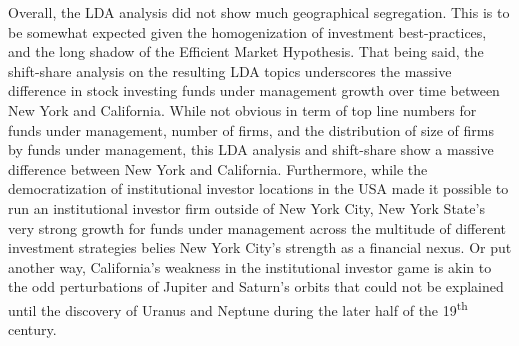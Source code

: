 Overall, the LDA analysis did not show much geographical segregation.  This is to be somewhat expected given the homogenization of investment best-practices, and the long shadow of the Efficient Market Hypothesis.  That being said, the shift-share analysis on the resulting LDA topics underscores the massive difference in stock investing funds under management growth over time between New York and California. While not obvious in term of top line numbers for funds under management, number of firms, and the distribution of size of firms by funds under management, this LDA analysis and shift-share show a massive difference between New York and California. Furthermore, while the democratization of institutional investor locations in the USA made it possible to run an institutional investor firm outside of New York City, New York State's very strong growth for funds under management across the multitude of different investment strategies belies New York City's strength as a financial nexus.  Or put another way, California's weakness in the institutional investor game is akin to the odd perturbations of Jupiter and Saturn's orbits that could not be explained until the discovery of Uranus and Neptune during the later half of the 19\textsuperscript{th} century.  

